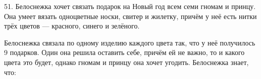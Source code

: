 51. Белоснежка хочет связать подарок на Новый год всем семи гномам и принцу. Она умеет вязать одноцветные носки, свитер и жилетку, причём у неё есть нитки трёх цветов --- красного, синего и зелёного.

Белоснежка связала по одному изделию каждого цвета так, что у неё получилось 9 подарков. Один она решила оставить себе, причём ей не важно, то и какого цвета это будет, однако гномам и принцу она хочет угодить. Белоснежка знает, что:\\
